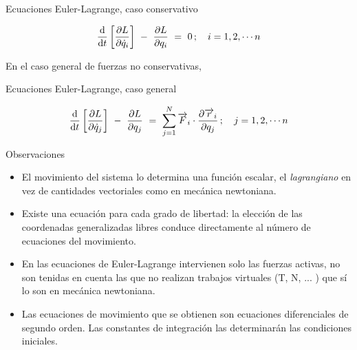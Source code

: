 \begin{myblock}{Ecuaciones Euler-Lagrange, caso conservativo}
\begin{large}
	\label{EELconservativas}
	\begin{equation}
	\dv{t} \left[ \pdv{ L }{\dot q_i} \right] \ - \ \pdv{L}{q_i} \ = \ 0	\, ; \quad i=1,2,\cdots n
	\end{equation}
\end{large}
\end{myblock}

En el caso general de fuerzas no conservativas,

\begin{myblock}{Ecuaciones Euler-Lagrange, caso general}
\begin{large}
	\begin{equation}
	\dv{t} \left[ \pdv{ L }{\dot q_j} \right] \ - \ \pdv{L}{q_j} \ = \ \sum_{j=1}^N\overrightarrow F_i \cdot \pdv{\overrightarrow r_i}{q_j} \, ; \quad j=1,2,\cdots n
	\end{equation}
\end{large}
\end{myblock}


\vspace{1.5cm}

\begin{myexampleblock}{Observaciones}

\begin{itemize}
\item El movimiento del sistema lo determina una función escalar, el \emph{lagrangiano} en vez de cantidades vectoriales como en mecánica newtoniana.
\item Existe una ecuación para cada grado de libertad: la elección de las coordenadas generalizadas libres conduce directamente al número de ecuaciones del movimiento.
\item En las ecuaciones de Euler-Lagrange intervienen solo las fuerzas activas, no son tenidas en cuenta las que no realizan trabajos virtuales (T, N, ... ) que sí lo son en mecánica newtoniana.
\item Las ecuaciones de movimiento que se obtienen son ecuaciones diferenciales de segundo orden. Las constantes de integración las determinarán las condiciones iniciales.
\end{itemize}
\end{myexampleblock}


\vspace{1cm}

